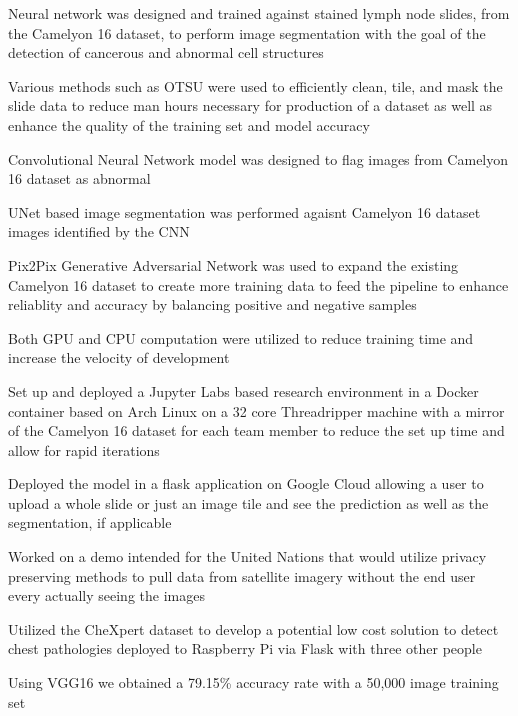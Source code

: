 \documentclass[letterpaper]{resume}
\begin{document}
\begin{compactitem}
\item Neural network was designed and trained against stained lymph node slides, from the Camelyon 16 dataset, to perform image segmentation with the goal of the detection of cancerous and abnormal cell structures
\item Various methods such as OTSU were used to efficiently clean, tile, and mask the slide data to reduce man hours necessary for production of a dataset as well as enhance the quality of the training set and model accuracy
\item Convolutional Neural Network model was designed to flag images from Camelyon 16 dataset as abnormal
\item UNet based image segmentation was performed agaisnt Camelyon 16 dataset images identified by the CNN
\item Pix2Pix Generative Adversarial Network was used to expand the existing Camelyon 16 dataset to create more training data to feed the pipeline to enhance reliablity and accuracy by balancing positive and negative samples
\item Both GPU and CPU computation were utilized to reduce training time and increase the velocity of development
\item Set up and deployed a Jupyter Labs based research environment in a Docker container based on Arch Linux on a 32 core Threadripper machine with a mirror of the Camelyon 16 dataset for each team member to reduce the set up time and allow for rapid iterations
\item Deployed the model in a flask application on Google Cloud allowing a user to upload a whole slide or just an image tile and see the prediction as well as the segmentation, if applicable
\end{compactitem}

\begin{compactitem}
\item Worked on a demo intended for the United Nations that would utilize privacy preserving methods to pull data from satellite imagery without the end user every actually seeing the images
\end{compactitem}

\begin{compactitem}
\item Utilized the CheXpert dataset to develop a potential low cost solution to detect chest pathologies deployed to Raspberry Pi via Flask with three other people
\item Using VGG16 we obtained a 79.15\% accuracy rate with a 50,000 image training set
\end{compactitem}
\end{document}
